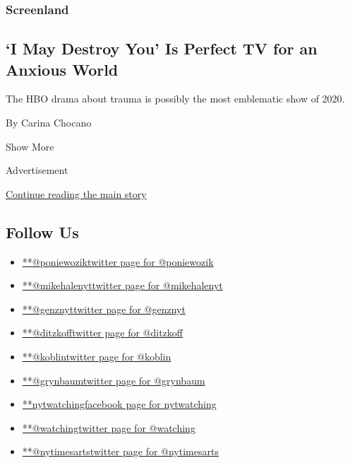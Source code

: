 \begin{enumerate}
  \hypertarget{screenland}{%
  \subsubsection{Screenland}\label{screenland}}

  \hypertarget{i-may-destroy-you-is-perfect-tv-for-an-anxious-world}{%
  \subsection{`I May Destroy You' Is Perfect TV for an Anxious
  World}\label{i-may-destroy-you-is-perfect-tv-for-an-anxious-world}}

  The HBO drama about trauma is possibly the most emblematic show of
  2020.

  By Carina Chocano
\end{enumerate}

Show More

Advertisement

\protect\hyperlink{after-mid2}{Continue reading the main story}

\hypertarget{follow-us}{%
\subsection{Follow Us}\label{follow-us}}

\begin{itemize}
\tightlist
\item
  \href{https://twitter.com/poniewozik}{**@poniewoziktwitter page for
  @poniewozik}
\item
  \href{https://twitter.com/mikehalenyt}{**@mikehalenyttwitter page for
  @mikehalenyt}
\item
  \href{https://twitter.com/genznyt}{**@genznyttwitter page for
  @genznyt}
\item
  \href{https://twitter.com/ditzkoff}{**@ditzkofftwitter page for
  @ditzkoff}
\item
  \href{https://twitter.com/koblin}{**@koblintwitter page for @koblin}
\item
  \href{https://twitter.com/grynbaum}{**@grynbaumtwitter page for
  @grynbaum}
\item
  \href{https://www.facebookcorewwwi.onion/nytwatching}{**nytwatchingfacebook
  page for nytwatching}
\item
  \href{https://twitter.com/watching}{**@watchingtwitter page for
  @watching}
\item
  \href{https://twitter.com/nytimesarts}{**@nytimesartstwitter page for
  @nytimesarts}
\end{itemize}

